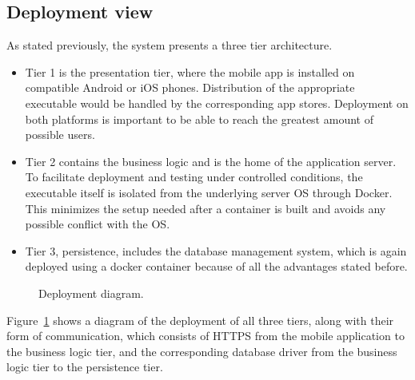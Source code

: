 \subsection{Deployment view}

As stated previously, the system presents a three tier architecture.
\begin{itemize}
    \item Tier 1 is the presentation tier, where the mobile app is installed on compatible Android or iOS phones. Distribution of the appropriate executable would be handled by the corresponding app stores. Deployment on both platforms is important to be able to reach the greatest amount of possible users.
    \item Tier 2 contains the business logic and is the home of the application server. To facilitate deployment and testing under controlled conditions, the executable itself is isolated from the underlying server OS through Docker. This minimizes the setup needed after a container is built and avoids any possible conflict with the OS.
    \item Tier 3, persistence, includes the database management system, which is again deployed using a docker container because of all the advantages stated before. 
\end{itemize}

\begin{figure}[H]
    \centering
    \caption{\label{fig:deployment-diagram}Deployment diagram.}
\end{figure}

Figure~\ref{fig:deployment-diagram} shows a diagram of the deployment of all three tiers, along with their form of communication, which consists of HTTPS from the mobile application to the business logic tier, and the corresponding database driver from the business logic tier to the persistence tier. 

